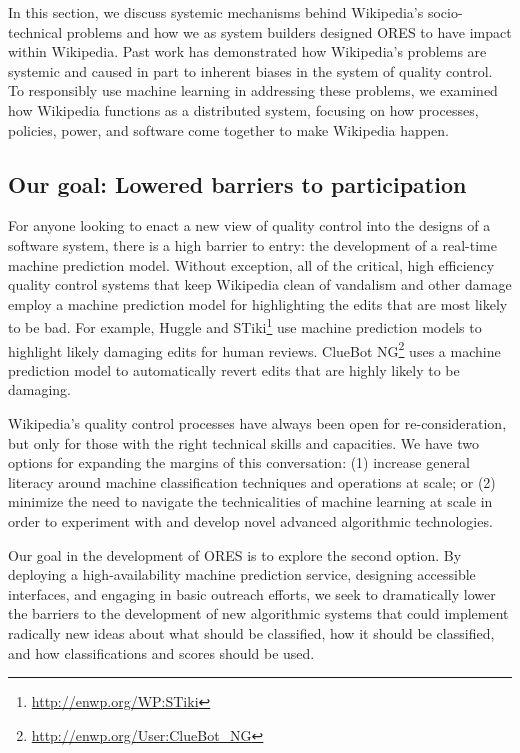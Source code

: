 In this section, we discuss systemic mechanisms behind Wikipedia's socio-technical problems and how we as system builders designed ORES to have impact within Wikipedia.  Past work has demonstrated how Wikipedia's problems are systemic and caused in part to inherent biases in the system of quality control. To responsibly use machine learning in addressing these problems, we examined how Wikipedia functions as a distributed system, focusing on how processes, policies, power, and software come together to make Wikipedia happen.

\subsection{Our goal: Lowered barriers to participation}
For anyone looking to enact a new view of quality control into the designs of a software system, there is a high barrier to entry: the development of a real-time machine prediction model.  Without exception, all of the critical, high efficiency quality control systems that keep Wikipedia clean of vandalism and other damage employ a machine prediction model for highlighting the edits that are most likely to be bad. For example, Huggle and STiki\footnote{\url{http://enwp.org/WP:STiki}} use machine prediction models to highlight likely damaging edits for human reviews.  ClueBot NG\footnote{\url{http://enwp.org/User:ClueBot_NG}} uses a machine prediction model to automatically revert edits that are highly likely to be damaging.

Wikipedia's quality control processes have always been open for re-consideration, but only for those with the right technical skills and capacities. We have two options for expanding the margins of this conversation\cite{mugar2017preserving}: (1) increase general literacy around machine classification techniques and operations at scale; or (2) minimize the need to navigate the technicalities of machine learning at scale in order to experiment with and develop novel advanced algorithmic technologies.

Our goal in the development of ORES is to explore the second option.  By deploying a high-availability machine prediction service, designing accessible interfaces, and engaging in basic outreach efforts, we seek to dramatically lower the barriers to the development of new algorithmic systems that could implement radically new ideas about what should be classified, how it should be classified, and how classifications and scores should be used.

